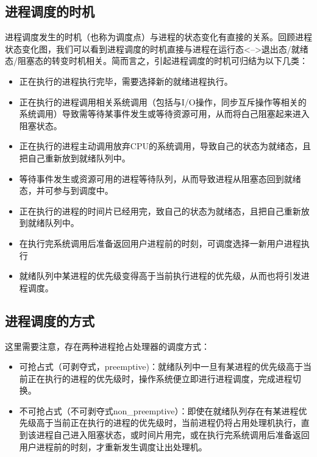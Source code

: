 \subsection{进程调度的时机}\label{ux8fdbux7a0bux8c03ux5ea6ux7684ux65f6ux673a}

进程调度发生的时机（也称为调度点）与进程的状态变化有直接的关系。回顾进程状态变化图，我们可以看到进程调度的时机直接与进程在运行态\textless{}--\textgreater{}退出态/就绪态/阻塞态的转变时机相关。简而言之，引起进程调度的时机可归结为以下几类：

\begin{itemize}
\item
  正在执行的进程执行完毕，需要选择新的就绪进程执行。
\item
  正在执行的进程调用相关系统调用（包括与I/O操作，同步互斥操作等相关的系统调用）导致需等待某事件发生或等待资源可用，从而将白己阻塞起来进入阻塞状态。
\item
  正在执行的进程主动调用放弃CPU的系统调用，导致自己的状态为就绪态，且把自己重新放到就绪队列中。
\item
  等待事件发生或资源可用的进程等待队列，从而导致进程从阻塞态回到就绪态，并可参与到调度中。
\item
  正在执行的进程的时间片已经用完，致自己的状态为就绪态，且把自己重新放到就绪队列中。
\item
  在执行完系统调用后准备返回用户进程前的时刻，可调度选择一新用户进程执行
\item
  就绪队列中某进程的优先级变得高于当前执行进程的优先级，从而也将引发进程调度。
\end{itemize}

\subsection{进程调度的方式}\label{ux8fdbux7a0bux8c03ux5ea6ux7684ux65b9ux5f0f}

这里需要注意，存在两种进程抢占处理器的调度方式：

\begin{itemize}
\item
  可抢占式（可剥夺式，preemptive)：就绪队列中一旦有某进程的优先级高于当前正在执行的进程的优先级时，操作系统便立即进行进程调度，完成进程切换。
\item
  不可抢占式（不可剥夺式non\_preemptive）：即使在就绪队列存在有某进程优先级高于当前正在执行的进程的优先级时，当前进程仍将占用处理机执行，直到该进程自己进入阻塞状态，或时间片用完，或在执行完系统调用后准备返回用户进程前的时刻，才重新发生调度让出处理机。
\end{itemize}

